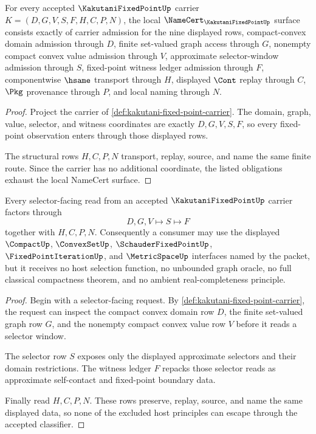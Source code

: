 \begin{theorem}\label{thm:kakutani-fixed-point-namecert-obligations}
For every accepted $\KakutaniFixedPointUp$ carrier $K=(D,G,V,S,F,H,C,P,N)$, the local $\NameCert_{\KakutaniFixedPointUp}$ surface consists exactly of carrier admission for the nine displayed rows, compact-convex domain admission through $D$, finite set-valued graph access through $G$, nonempty compact convex value admission through $V$, approximate selector-window admission through $S$, fixed-point witness ledger admission through $F$, componentwise $\hsame$ transport through $H$, displayed $\Cont$ replay through $C$, $\Pkg$ provenance through $P$, and local naming through $N$.
\end{theorem}
\begin{proof}
Project the carrier of \autoref{def:kakutani-fixed-point-carrier}. The domain, graph, value, selector, and witness coordinates are exactly $D,G,V,S,F$, so every fixed-point observation enters through those displayed rows.

The structural rows $H,C,P,N$ transport, replay, source, and name the same finite route. Since the carrier has no additional coordinate, the listed obligations exhaust the local NameCert surface.
\end{proof}

\begin{theorem}\label{thm:kakutani-fixed-point-graph-selector-nonescape}
Every selector-facing read from an accepted $\KakutaniFixedPointUp$ carrier factors through
$$
D,G,V\longmapsto S\longmapsto F
$$
together with $H,C,P,N$. Consequently a consumer may use the displayed $\CompactUp$, $\ConvexSetUp$, $\SchauderFixedPointUp$, $\FixedPointIterationUp$, and $\MetricSpaceUp$ interfaces named by the packet, but it receives no host selection function, no unbounded graph oracle, no full classical compactness theorem, and no ambient real-completeness principle.
\end{theorem}
\begin{proof}
Begin with a selector-facing request. By \autoref{def:kakutani-fixed-point-carrier}, the request can inspect the compact convex domain row $D$, the finite set-valued graph row $G$, and the nonempty compact convex value row $V$ before it reads a selector window.

The selector row $S$ exposes only the displayed approximate selectors and their domain restrictions. The witness ledger $F$ repacks those selector reads as approximate self-contact and fixed-point boundary data.

Finally read $H,C,P,N$. These rows preserve, replay, source, and name the same displayed data, so none of the excluded host principles can escape through the accepted classifier.
\end{proof}

